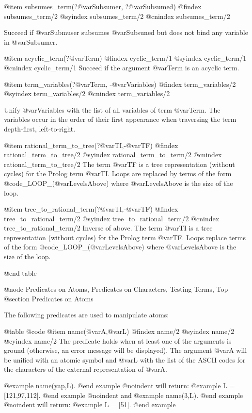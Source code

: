 {{{{@item subsumes_term(?@var{Subsumer}, ?@var{Subsumed})
@findex  subsumes_term/2
@syindex subsumes_term/2
@cnindex subsumes_term/2

Succeed if @var{Submuser} subsumes @var{Subsuned} but does not bind any
variable in @var{Subsumer}.

@item acyclic_term(?@var{Term})
@findex cyclic_term/1
@syindex cyclic_term/1
@cnindex cyclic_term/1
Succeed if the argument @var{Term} is an acyclic term.

@item term_variables(?@var{Term}, -@var{Variables})
@findex  term_variables/2
@syindex term_variables/2
@cnindex term_variables/2

Unify @var{Variables} with the list of all variables of term
@var{Term}.  The variables occur in the order of their first
appearance when traversing the term depth-first, left-to-right.

@item rational_term_to_tree(?@var{TI},-@var{TF})
@findex rational_term_to_tree/2
@syindex rational_term_to_term/2
@cnindex rational_term_to_tree/2
The term @var{TF} is a tree representation (without cycles) for the
 Prolog term @var{TI}. Loops are replaced by terms of the form
 @code{_LOOP_(@var{LevelsAbove})} where @var{LevelsAbove} is the size of
 the loop.

@item tree_to_rational_term(?@var{TI},-@var{TF})
@findex tree_to_rational_term/2
@syindex tree_to_rational_term/2
@cnindex tree_to_rational_term/2
Inverse of above. The term @var{TI} is a tree representation (without
 cycles) for the Prolog term @var{TF}. Loops replace terms of the form
 @code{_LOOP_(@var{LevelsAbove})} where @var{LevelsAbove} is the size of
 the loop.


@end table

@node Predicates on Atoms, Predicates on Characters, Testing Terms, Top
@section Predicates on Atoms

The following predicates are used to manipulate atoms:

@table @code
@item name(@var{A},@var{L})
@findex name/2
@syindex name/2
@cyindex name/2
The predicate holds when at least one of the arguments is ground
(otherwise, an error message will be displayed). The argument @var{A} will
be unified with an atomic symbol and @var{L} with the list of the ASCII
codes for the characters of the external representation of @var{A}.

@example
 name(yap,L).
@end example
@noindent
will return:
@example
 L = [121,97,112].
@end example
@noindent
and
@example
 name(3,L).
@end example
@noindent
will return:
@example
 L = [51].
@end example

}}}}

